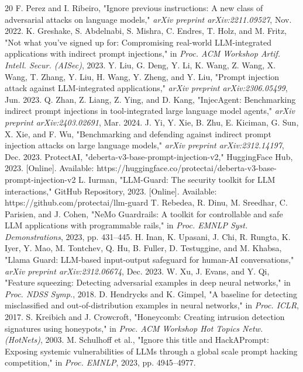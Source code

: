 \documentclass[conference]{IEEEtran}
\begin{document}
\begin{thebibliography}{20}
 F. Perez and I. Ribeiro, "Ignore previous instructions: A new class of adversarial attacks on language models," \emph{arXiv preprint arXiv:2211.09527}, Nov. 2022.
 K. Greshake, S. Abdelnabi, S. Mishra, C. Endres, T. Holz, and M. Fritz, "Not what you've signed up for: Compromising real-world LLM-integrated applications with indirect prompt injections," in \emph{Proc. ACM Workshop Artif. Intell. Secur. (AISec)}, 2023.
 Y. Liu, G. Deng, Y. Li, K. Wang, Z. Wang, X. Wang, T. Zhang, Y. Liu, H. Wang, Y. Zheng, and Y. Liu, "Prompt injection attack against LLM-integrated applications," \emph{arXiv preprint arXiv:2306.05499}, Jun. 2023.
 Q. Zhan, Z. Liang, Z. Ying, and D. Kang, "InjecAgent: Benchmarking indirect prompt injections in tool-integrated large language model agents," \emph{arXiv preprint arXiv:2403.02691}, Mar. 2024.
 J. Yi, Y. Xie, B. Zhu, E. Kiciman, G. Sun, X. Xie, and F. Wu, "Benchmarking and defending against indirect prompt injection attacks on large language models," \emph{arXiv preprint arXiv:2312.14197}, Dec. 2023.
 ProtectAI, "deberta-v3-base-prompt-injection-v2," HuggingFace Hub, 2023. [Online]. Available: https://huggingface.co/protectai/deberta-v3-base-prompt-injection-v2
 L. Iurman, "LLM-Guard: The security toolkit for LLM interactions," GitHub Repository, 2023. [Online]. Available: https://github.com/protectai/llm-guard
 T. Rebedea, R. Dinu, M. Sreedhar, C. Parisien, and J. Cohen, "NeMo Guardrails: A toolkit for controllable and safe LLM applications with programmable rails," in \emph{Proc. EMNLP Syst. Demonstrations}, 2023, pp. 431--445.
 H. Inan, K. Upasani, J. Chi, R. Rungta, K. Iyer, Y. Mao, M. Tontchev, Q. Hu, B. Fuller, D. Testuggine, and M. Khabsa, "Llama Guard: LLM-based input-output safeguard for human-AI conversations," \emph{arXiv preprint arXiv:2312.06674}, Dec. 2023.
 W. Xu, J. Evans, and Y. Qi, "Feature squeezing: Detecting adversarial examples in deep neural networks," in \emph{Proc. NDSS Symp.}, 2018.
 D. Hendrycks and K. Gimpel, "A baseline for detecting misclassified and out-of-distribution examples in neural networks," in \emph{Proc. ICLR}, 2017.
 S. Kreibich and J. Crowcroft, "Honeycomb: Creating intrusion detection signatures using honeypots," in \emph{Proc. ACM Workshop Hot Topics Netw. (HotNets)}, 2003.
 M. Schulhoff et al., "Ignore this title and HackAPrompt: Exposing systemic vulnerabilities of LLMs through a global scale prompt hacking competition," in \emph{Proc. EMNLP}, 2023, pp. 4945--4977.

\end{thebibliography}
\end{document}
